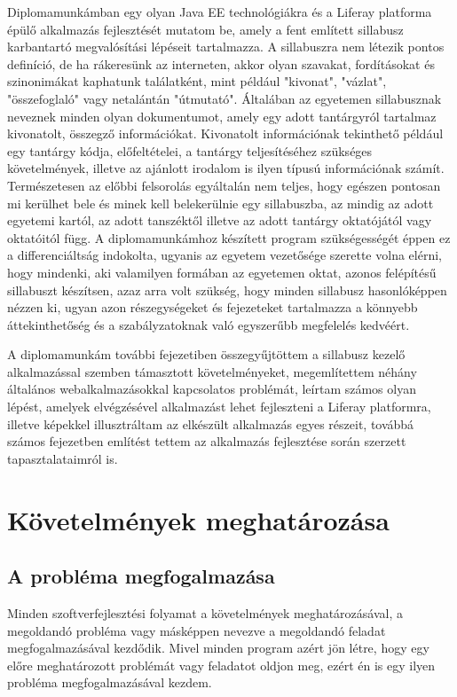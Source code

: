 \documentclass[hidelinks, 12pt, a4paper]{report}
\begin{document}
Diplomamunkámban egy olyan Java EE technológiákra \cite{java-se-platformon, java-ee-platformon} és a Liferay platforma épülő alkalmazás fejlesztését mutatom be, amely a fent említett sillabusz karbantartó megvalósítási lépéseit tartalmazza. A sillabuszra \cite{sillabusz} nem létezik pontos definíció, de ha rákeresünk az interneten, akkor olyan szavakat, fordításokat és szinonimákat kaphatunk találatként, mint például "kivonat", "vázlat", "összefoglaló" vagy netalántán "útmutató". Általában az egyetemen sillabusznak neveznek minden olyan dokumentumot, amely egy adott tantárgyról tartalmaz kivonatolt, összegző információkat. Kivonatolt információnak tekinthető például egy tantárgy kódja, előfeltételei, a tantárgy teljesítéséhez szükséges követelmények, illetve az ajánlott irodalom is ilyen típusú információnak számít. Természetesen az előbbi felsorolás egyáltalán nem teljes, hogy egészen pontosan mi kerülhet bele és minek kell belekerülnie egy sillabuszba, az mindig az adott egyetemi kartól, az adott tanszéktől illetve az adott tantárgy oktatójától vagy oktatóitól függ. A diplomamunkámhoz készített program szükségességét éppen ez a differenciáltság indokolta, ugyanis az egyetem vezetősége szerette volna elérni, hogy mindenki, aki valamilyen formában az egyetemen oktat, azonos felépítésű sillabuszt készítsen, azaz arra volt szükség, hogy minden sillabusz hasonlóképpen nézzen ki, ugyan azon részegységeket és fejezeteket tartalmazza a könnyebb áttekinthetőség és a szabályzatoknak való egyszerűbb megfelelés kedvéért.

A diplomamunkám további fejezetiben összegyűjtöttem a sillabusz kezelő alkalmazással szemben támasztott követelményeket, megemlítettem néhány általános webalkalmazásokkal kapcsolatos problémát, leírtam számos olyan lépést, amelyek elvégzésével alkalmazást lehet fejleszteni a Liferay platformra, illetve képekkel illusztráltam az elkészült alkalmazás egyes részeit, továbbá számos fejezetben említést tettem az alkalmazás fejlesztése során szerzett tapasztalataimról is.

\chapter{Követelmények meghatározása}

\section{A probléma megfogalmazása}

Minden szoftverfejlesztési folyamat a követelmények meghatározásával, a megoldandó probléma vagy másképpen nevezve a megoldandó feladat megfogalmazásával kezdődik. Mivel minden program azért jön létre, hogy egy előre meghatározott problémát vagy feladatot oldjon meg, ezért én is egy ilyen probléma megfogalmazásával kezdem.
\end{document}
